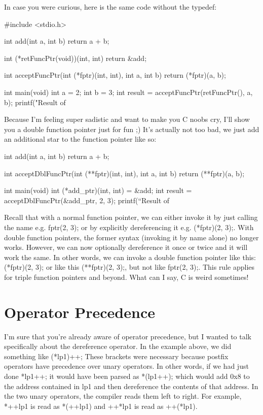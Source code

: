\documentclass{article}
\begin{document}
In case you were curious, here is the same code without the typedef:

\begin{cblk}
#include <stdio.h>

int add(int a, int b) {
   return a + b;
}

int (*retFuncPtr(void))(int, int) {
   return &add;
}

int acceptFuncPtr(int (*fptr)(int, int), int a, int b) {
   return (*fptr)(a, b);
}

int main(void) {
   int a = 2;
   int b = 3;
   int result = acceptFuncPtr(retFuncPtr(), a, b);
   printf("Result of %
}
\end{cblk}

Because I’m feeling super sadistic and want to make you C noobs cry, I’ll show you a double function pointer
just for fun ;) It’s actually not too bad, we just add an additional star to the function pointer like so:

\begin{cblk}
int add(int a, int b) {
	return a + b;
}

int acceptDblFuncPtr(int (**fptr)(int, int), int a, int b) {
	return (**fptr)(a, b);
}

int main(void) {
	int (*add_ptr)(int, int) = &add;
	int result = acceptDblFuncPtr(&add_ptr, 2, 3);
	printf(“Result of %
}
\end{cblk}

Recall that with a normal function pointer, we can either invoke it by just calling the name e.g. fptr(2, 3);
or by explicitly dereferencing it e.g. (*fptr)(2, 3);. With double function pointers, the former syntax
(invoking it by name alone) no longer works. However, we can now optionally dereference it once or twice and
it will work the same. In other words, we can invoke a double function pointer like this: (*fptr)(2, 3); or
like this (**fptr)(2, 3);, but not like fptr(2, 3);. This rule applies for triple function pointers and
beyond. What can I say, C is weird sometimes!

\section{Operator Precedence}

I’m sure that you’re already aware of operator precedence, but I wanted to talk specifically about the
dereference operator. In the example above, we did something like (*lp1)++; These brackets were necessary
because postfix operators have precedence over unary operators. In other words, if we had just done *lp1++;
it would have been parsed as *(lp1++); which would add 0x8 to the address contained in lp1 and then
dereference the contents of that address. In the  two unary operators, the compiler reads them left to right.
For example, *++lp1 is read as *(++lp1) and ++*lp1 is read as ++(*lp1).
\end{document}

